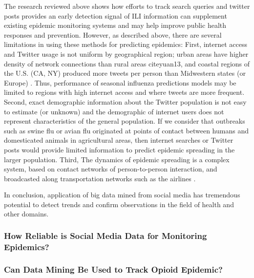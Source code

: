 \documentclass[sigconf]{acmart}
\begin{document}
The research reviewed above shows how efforts to track search queries and twitter posts 
provides an early detection signal of ILI information can supplement existing epidemic 
monitoring systems and may help improve public health responses and prevention. However, 
as described above, there are several limitations in using these methods for predicting 
epidemics: First, internet access and Twitter usage is not uniform by geographical region; 
urban areas have higher density of network connections than rural areas cite{yuan13}, and 
coastal regions of the U.S. (CA, NY) produced more tweets per person than Midwestern states 
(or Europe) \cite{achrekar12}. Thus, performance of seasonal influenza predictions models 
may be limited to regions with high internet access and where tweets are more frequent. 
Second, exact demographic information about the Twitter population is not easy to estimate 
(or unknown) and the demographic of internet users does not represent characteristics of 
the general population. If we consider that outbreaks such as swine flu or avian flu 
originated at points of contact between humans and domesticated animals in agricultural 
areas, then internet searches or Twitter posts would provide limited information to predict 
epidemic spreading in the larger population. Third, The dynamics of epidemic spreading is 
a complex system, based on contact networks of person-to-person interaction, and broadcasted 
along transportation networks such as the airlines \cite{colizza06}.  


In conclusion, application of big data mined from social media has tremendous potential to 
detect trends and confirm observations in the field of health and other domains. 


\subsubsection{How Reliable is Social Media Data for Monitoring Epidemics?}


\subsubsection{Can Data Mining Be Used to Track Opioid Epidemic?}



 
\end{document}
